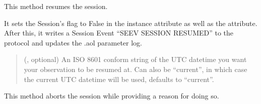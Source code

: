\documentclass[letterpaper,10pt,english]{sphinxmanual}
\begin{document}
\begin{fulllineitems}
\begin{fulllineitems}
\begin{quote}
\begin{description}
\end{description}\end{quote}

\end{fulllineitems}


\begin{fulllineitems}
\label{\detokenize{autoapi/aop/aop/index:aop.aop.Session.resume}}
\pysigstartsignatures
{}
\pysigstopsignatures
\sphinxAtStartPar
This method resumes the session.

\sphinxAtStartPar
It sets the Session’s  flag to False in the instance
attribute as well as the  attribute. After this, it writes a
Session Event “SEEV SESSION RESUMED” to the protocol and updates the
.aol parameter log.
\begin{quote}\begin{description}
\sphinxAtStartPar
{} (, optional) \textendash{} An ISO 8601 conform string of the UTC datetime you want your
observation to be resumed at. Can also be “current”, in which case the
current UTC datetime will be used, defaults to “current”.

\end{description}\end{quote}

\end{fulllineitems}


\begin{fulllineitems}
\label{\detokenize{autoapi/aop/aop/index:aop.aop.Session.abort}}
\pysigstartsignatures
{}
\pysigstopsignatures
\sphinxAtStartPar
This method aborts the session while providing a reason for doing so.


\end{fulllineitems}
\end{fulllineitems}
\end{document}
